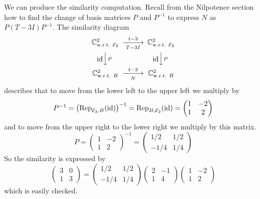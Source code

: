 \begin{example}
We can produce the similarity computation.
Recall from the Nilpotence section how to find the change of
basis matrices $P$ and $P^{-1}$ to express \( N \) as \( P(T-3I)P^{-1} \).
The similarity diagram
\begin{equation*}
  \begin{CD}
    \C^2_\wrt{\stdbasis_2}      @>t-3>T-3I>      \C^2_\wrt{\stdbasis_2}     \\
    @V\scriptstyle\identity V\scriptstyle PV  
                                 @V\scriptstyle\identity V\scriptstyle PV \\
    \C^2_\wrt{B}                 @>t-3>N>         \C^2_\wrt{B}
  \end{CD}
\end{equation*}
describes that to move from the lower left to the upper left we multiply by
\begin{equation*}
  P^{-1}=\bigl({\rm Rep}_{{\cal E}_2,B}(\mbox{id})\bigr)^{-1}
    ={\rm Rep}_{B,{\cal E}_2}(\mbox{id})
    =\begin{pmatrix}
        1  &-2  \\
        1  &2
     \end{pmatrix}
\end{equation*}
and to move from the upper right to the lower right we multiply by
this matrix.
\begin{equation*}
  P=\begin{pmatrix}
      1  &-2  \\
      1  &2
     \end{pmatrix}^{-1}
   =\begin{pmatrix}
      1/2  &1/2  \\
      -1/4 &1/4
   \end{pmatrix}
\end{equation*}
So the similarity is expressed by
\begin{equation*}
  \begin{pmatrix}
     3  &0  \\
     1  &3
  \end{pmatrix}
  =
  \begin{pmatrix}
      1/2  &1/2  \\
      -1/4 &1/4
   \end{pmatrix}
   \begin{pmatrix}
      2  &-1  \\
      1  &4
    \end{pmatrix}
    \begin{pmatrix}
        1  &-2  \\
        1  &2
     \end{pmatrix}
\end{equation*}
which is easily checked.
\end{example}

